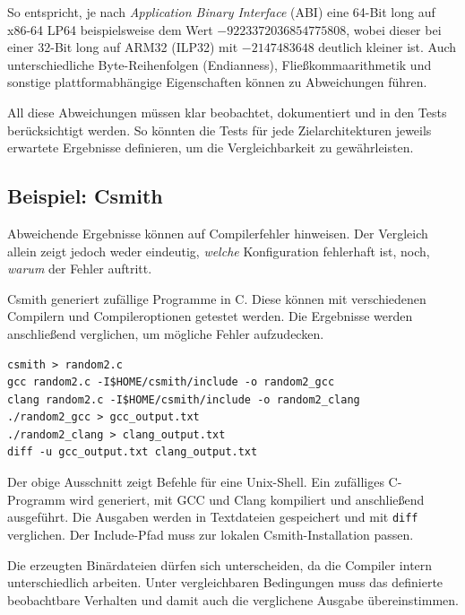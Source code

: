 \documentclass[a4paper,11pt]{article}
\begin{document}
So entspricht, je nach \emph{Application Binary Interface} (ABI) eine 64-Bit long auf x86-64 LP64 beispielsweise dem Wert $-9223372036854775808$, wobei dieser bei einer 32-Bit long auf ARM32 (ILP32) mit $-2147483648$ deutlich kleiner ist. Auch unterschiedliche Byte-Reihenfolgen (Endianness), Fließkommaarithmetik und sonstige plattformabhängige Eigenschaften können zu Abweichungen führen. \parencite{amd64_psabi_2018} \parencite{arm_aapcs32} \parencite{wg14_n1570_2011}

All diese Abweichungen müssen klar beobachtet, dokumentiert und in den Tests berücksichtigt werden. So könnten die Tests für jede Zielarchitekturen jeweils erwartete Ergebnisse definieren, um die Vergleichbarkeit zu gewährleisten.


\subsection{Beispiel: Csmith}

Abweichende Ergebnisse können auf Compilerfehler hinweisen.
Der Vergleich allein zeigt jedoch weder eindeutig, \emph{welche}
Konfiguration fehlerhaft ist, noch, \emph{warum} der Fehler auftritt.

Csmith \parencite{csmith} generiert zufällige Programme in C. Diese können mit
verschiedenen Compilern und Compileroptionen getestet werden. Die
Ergebnisse werden anschließend verglichen, um mögliche Fehler aufzudecken.

\begin{verbatim}
csmith > random2.c
gcc random2.c -I$HOME/csmith/include -o random2_gcc
clang random2.c -I$HOME/csmith/include -o random2_clang
./random2_gcc > gcc_output.txt
./random2_clang > clang_output.txt
diff -u gcc_output.txt clang_output.txt
\end{verbatim}

Der obige Ausschnitt zeigt Befehle für eine Unix-Shell. Ein zufälliges
C-Programm wird generiert, mit GCC und Clang kompiliert und anschließend
ausgeführt. Die Ausgaben werden in Textdateien gespeichert und mit
\texttt{diff} verglichen. Der Include-Pfad muss zur lokalen
Csmith-Installation passen.

Die erzeugten Binärdateien dürfen sich unterscheiden, da die Compiler intern
unterschiedlich arbeiten. Unter vergleichbaren Bedingungen muss das definierte
beobachtbare Verhalten und damit auch die verglichene Ausgabe übereinstimmen.



\clearpage
\printbibliography
\end{document}
